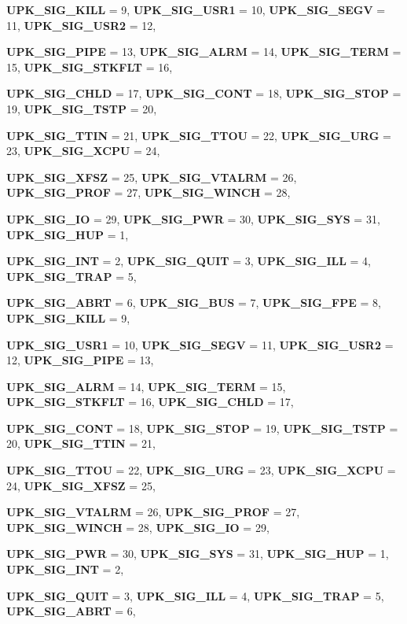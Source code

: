 \begin{DoxyCompactItemize}
\par
{\bf UPK\_\-SIG\_\-KILL} =  9, 
{\bf UPK\_\-SIG\_\-USR1} =  10, 
{\bf UPK\_\-SIG\_\-SEGV} =  11, 
{\bf UPK\_\-SIG\_\-USR2} =  12, 
\par
{\bf UPK\_\-SIG\_\-PIPE} =  13, 
{\bf UPK\_\-SIG\_\-ALRM} =  14, 
{\bf UPK\_\-SIG\_\-TERM} =  15, 
{\bf UPK\_\-SIG\_\-STKFLT} =  16, 
\par
{\bf UPK\_\-SIG\_\-CHLD} =  17, 
{\bf UPK\_\-SIG\_\-CONT} =  18, 
{\bf UPK\_\-SIG\_\-STOP} =  19, 
{\bf UPK\_\-SIG\_\-TSTP} =  20, 
\par
{\bf UPK\_\-SIG\_\-TTIN} =  21, 
{\bf UPK\_\-SIG\_\-TTOU} =  22, 
{\bf UPK\_\-SIG\_\-URG} =  23, 
{\bf UPK\_\-SIG\_\-XCPU} =  24, 
\par
{\bf UPK\_\-SIG\_\-XFSZ} =  25, 
{\bf UPK\_\-SIG\_\-VTALRM} =  26, 
{\bf UPK\_\-SIG\_\-PROF} =  27, 
{\bf UPK\_\-SIG\_\-WINCH} =  28, 
\par
{\bf UPK\_\-SIG\_\-IO} =  29, 
{\bf UPK\_\-SIG\_\-PWR} =  30, 
{\bf UPK\_\-SIG\_\-SYS} =  31, 
{\bf UPK\_\-SIG\_\-HUP} =  1, 
\par
{\bf UPK\_\-SIG\_\-INT} =  2, 
{\bf UPK\_\-SIG\_\-QUIT} =  3, 
{\bf UPK\_\-SIG\_\-ILL} =  4, 
{\bf UPK\_\-SIG\_\-TRAP} =  5, 
\par
{\bf UPK\_\-SIG\_\-ABRT} =  6, 
{\bf UPK\_\-SIG\_\-BUS} =  7, 
{\bf UPK\_\-SIG\_\-FPE} =  8, 
{\bf UPK\_\-SIG\_\-KILL} =  9, 
\par
{\bf UPK\_\-SIG\_\-USR1} =  10, 
{\bf UPK\_\-SIG\_\-SEGV} =  11, 
{\bf UPK\_\-SIG\_\-USR2} =  12, 
{\bf UPK\_\-SIG\_\-PIPE} =  13, 
\par
{\bf UPK\_\-SIG\_\-ALRM} =  14, 
{\bf UPK\_\-SIG\_\-TERM} =  15, 
{\bf UPK\_\-SIG\_\-STKFLT} =  16, 
{\bf UPK\_\-SIG\_\-CHLD} =  17, 
\par
{\bf UPK\_\-SIG\_\-CONT} =  18, 
{\bf UPK\_\-SIG\_\-STOP} =  19, 
{\bf UPK\_\-SIG\_\-TSTP} =  20, 
{\bf UPK\_\-SIG\_\-TTIN} =  21, 
\par
{\bf UPK\_\-SIG\_\-TTOU} =  22, 
{\bf UPK\_\-SIG\_\-URG} =  23, 
{\bf UPK\_\-SIG\_\-XCPU} =  24, 
{\bf UPK\_\-SIG\_\-XFSZ} =  25, 
\par
{\bf UPK\_\-SIG\_\-VTALRM} =  26, 
{\bf UPK\_\-SIG\_\-PROF} =  27, 
{\bf UPK\_\-SIG\_\-WINCH} =  28, 
{\bf UPK\_\-SIG\_\-IO} =  29, 
\par
{\bf UPK\_\-SIG\_\-PWR} =  30, 
{\bf UPK\_\-SIG\_\-SYS} =  31, 
{\bf UPK\_\-SIG\_\-HUP} =  1, 
{\bf UPK\_\-SIG\_\-INT} =  2, 
\par
{\bf UPK\_\-SIG\_\-QUIT} =  3, 
{\bf UPK\_\-SIG\_\-ILL} =  4, 
{\bf UPK\_\-SIG\_\-TRAP} =  5, 
{\bf UPK\_\-SIG\_\-ABRT} =  6, 

\end{DoxyCompactItemize}

